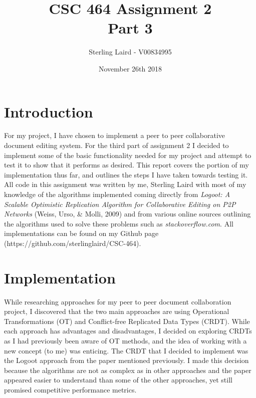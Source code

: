 \documentclass[11pt]{article}
\title{CSC 464 Assignment 2\\Part 3}
\author{Sterling Laird - V00834995}
\date{November 26th 2018}
\begin{document}
\maketitle

\section{Introduction}
For my project, I have chosen to implement a peer to peer collaborative document editing system. For the third part of assignment 2 I decided to implement some of the basic functionality needed for my project and attempt to test it to show that it performs as desired. This report covers the portion of my implementation thus far, and outlines the steps I have taken towards testing it.\\

All code in this assignment was written by me, Sterling Laird with most of my knowledge of the algorithms implemented coming directly from \textit{Logoot: A Scalable Optimistic Replication Algorithm for Collaborative Editing on P2P Networks} (Weiss, Urso, \& Molli, 2009) and from various online sources outlining the algorithms used to solve these problems such as \textit{stackoverflow.com}. All implementations can be found on my Github page \\(https://github.com/sterlinglaird/CSC-464).

\pagebreak

\section{Implementation}
While researching approaches for my peer to peer document collaboration project, I discovered that the two main approaches are using Operational Transformations (OT) and Conflict-free Replicated Data Types (CRDT). While each approach has advantages and disadvantages, I decided on exploring CRDTs as I had previously been aware of OT methods, and the idea of working with a new concept (to me) was enticing. The CRDT that I decided to implement was the Logoot approach from the paper mentioned previously. I made this decision because the algorithms are not as complex as in other approaches and the paper appeared easier to understand than some of the other approaches, yet still promised competitive performance metrics.\\
\end{document}
